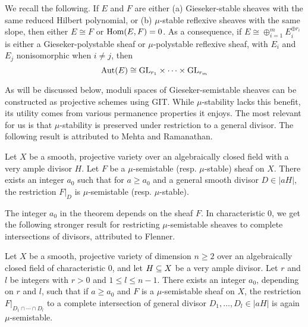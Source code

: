 We recall the following. If $E$ and $F$ are either (a) Gieseker-stable sheaves with the same reduced Hilbert polynomial, or (b) $\mu$-stable reflexive sheaves with the same slope, then either $E \cong F$ or $\mathrm{Hom}(E, F) = 0$. As a consequence, if $E \cong \oplus_{i=1}^m E_i^{\oplus r_i}$ is either a Gieseker-polystable sheaf or $\mu$-polystable reflexive sheaf, with $E_i$ and $E_j$ nonisomorphic when $i \neq j$, then
\[ \mathrm{Aut}(E) \cong \mathrm{GL}_{r_1} \times \cdots \times \mathrm{GL}_{r_m} \]

As will be discussed below, moduli spaces of Gieseker-semistable sheaves can be constructed as projective schemes using GIT. While $\mu$-stability lacks this benefit, its utility comes from various permanence properties it enjoys. The most relevant for us is that $\mu$-stability is preserved under restriction to a general divisor. The following result is attributed to Mehta and Ramanathan.

\begin{thm}\label{mehta-ramanathan}
    Let $X$ be a smooth, projective variety over an algebraically closed field with a very ample divisor $H$. Let $F$ be a $\mu$-semistable (resp. $\mu$-stable) sheaf on $X$. There exists an integer $a_0$ such that for $a \ge a_0$ and a general smooth divisor $D \in |a H|$, the restriction $F|_D$ is $\mu$-semistable (resp. $\mu$-stable).
\end{thm}

The integer $a_0$ in the theorem depends on the sheaf $F$. In characteristic 0, we get the following stronger result for restricting $\mu$-semistable sheaves to complete intersections of divisors, attributed to Flenner.

\begin{thm}\label{flenner}
    Let $X$ be a smooth, projective variety of dimension $n \ge 2$ over an algebraically closed field of characteristic 0, and let $H \subseteq X$ be a very ample divisor. Let $r$ and $l$ be integers with $r > 0$ and $1 \le l \le n-1$. There exists an integer $a_0$, depending on $r$ and $l$, such that if $a \ge a_0$ and $F$ is a $\mu$-semistable sheaf on $X$, the restriction $F|_{D_1 \cap \cdots \cap D_l}$ to a complete intersection of general divisor $D_1, \ldots, D_l \in |a H|$ is again $\mu$-semistable.
\end{thm}


